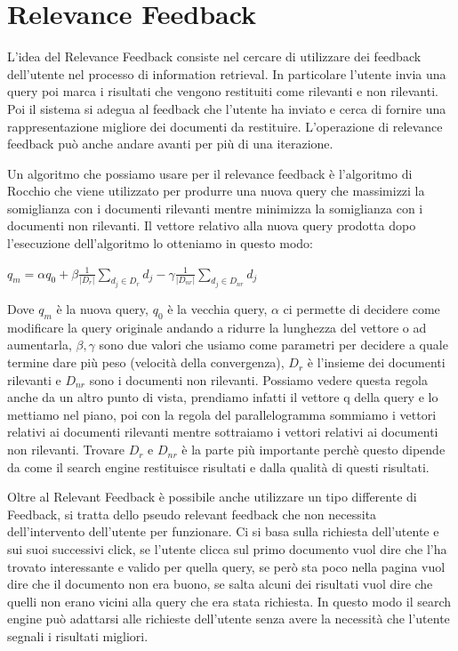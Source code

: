 \documentclass[14pt]{extreport}
\begin{document}
\section{Relevance Feedback}

L'idea del Relevance Feedback consiste nel cercare di utilizzare dei feedback dell'utente nel processo di information retrieval.
In particolare l'utente invia una query poi marca i risultati che vengono restituiti come rilevanti e non rilevanti.
Poi il sistema si adegua al feedback che l'utente ha inviato e cerca di fornire una rappresentazione migliore dei documenti da restituire.
L'operazione di relevance feedback può anche andare avanti per più di una iterazione.

Un algoritmo che possiamo usare per il relevance feedback è l'algoritmo di Rocchio che viene utilizzato per produrre una nuova query che massimizzi la somiglianza con i documenti rilevanti mentre minimizza la somiglianza con i documenti non rilevanti.
Il vettore relativo alla nuova query prodotta dopo l'esecuzione dell'algoritmo lo otteniamo in questo modo:
\newline
\centerline{$q_m = \alpha q_0 + \beta \frac{1}{|D_r|}\sum\limits_{d_j \in D_r} d_j- \gamma\frac{1}{|D_{nr}|}\sum\limits_{d_j \in D_{nr}} d_j$}

Dove $q_m$ è la nuova query, $q_0$ è la vecchia query, $\alpha$ ci permette di decidere come modificare la query originale andando a ridurre la lunghezza del vettore o ad aumentarla, $\beta, \gamma$ sono due valori che usiamo come parametri per decidere a quale termine dare più peso (velocità della convergenza), $D_r$ è l'insieme dei documenti rilevanti e $D_{nr}$ sono i documenti non rilevanti.
Possiamo vedere questa regola anche da un altro punto di vista, prendiamo infatti il vettore q della query e lo mettiamo nel piano, poi con la regola del parallelogramma sommiamo i vettori relativi ai documenti rilevanti mentre sottraiamo i vettori relativi ai documenti non rilevanti.
Trovare $D_r$ e $D_{nr}$ è la parte più importante perchè questo dipende da come il search engine restituisce risultati e dalla qualità di questi risultati.

Oltre al Relevant Feedback è possibile anche utilizzare un tipo differente di Feedback, si tratta dello pseudo relevant feedback che non necessita dell'intervento dell'utente per funzionare.
Ci si basa sulla richiesta dell'utente e sui suoi successivi click, se l'utente clicca sul primo documento vuol dire che l'ha trovato interessante e valido per quella query, se però sta poco nella pagina vuol dire che il documento non era buono, se salta alcuni dei risultati vuol dire che quelli non erano vicini alla query che era stata richiesta.
In questo modo il search engine può adattarsi alle richieste dell'utente senza avere la necessità che l'utente segnali i risultati migliori.
\end{document}
